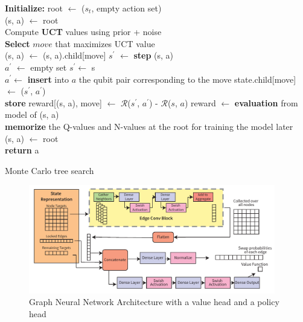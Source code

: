 \documentclass[%
 reprint,
amsmath,amssymb,
pra,
]{revtex4-2}
\begin{document}
\begin{algorithm}[t]
	\SetAlgoLined
	\DontPrintSemicolon
	\textbf{Initialize:} root $\leftarrow$ ($s_t$, empty action set) \\
	 {
	(s, a) $\gets$ root\\
	 {
		Compute \textbf{UCT} values using prior + noise \\
	    \textbf{Select} $move$ that maximizes UCT value \\
    	 {
    	    (s, a) $\gets$ (s, a).child[move]
    	} {
    		 {
    			$s^\prime$ $\gets$ \textbf{step} (s, a) \\
                $a^\prime$ $\leftarrow$ empty set
            } {
                $s^\prime \gets$ s \\
    		    $a^\prime \gets$ \textbf{insert} into $a$ the qubit pair corresponding to the move
    		}
    	    state.child[move] $\gets$ ($s^\prime$, $a^\prime$) \\
    	    \textbf{store} reward[(s, a), move] $\gets$ $\mathcal{R}$($s^\prime$, $a^\prime$) - $\mathcal{R}$($s$, $a$) 
    	}%
	}%
	    reward $\gets$ \textbf{evaluation} from model of (s, a) \\
    }%
	\textbf{memorize} the Q-values and N-values at the root for training the model later \\
    (s, a)  $\gets$ root \\
    \textbf{return} a

    \caption{Monte Carlo tree search}
\label{algo:mcts}
\end{algorithm}

\begin{figure}[ht]
    \includegraphics[width=0.96\textwidth]{images/Architecture.pdf}
    \caption{\label{fig:network-architecture}
        Graph Neural Network Architecture with a value head and a policy head}
\end{figure}
\end{document}
